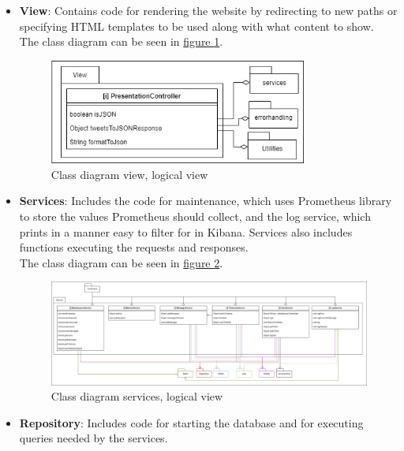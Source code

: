 \begin{itemize}
    \item \textbf{View}: Contains code for rendering the website by redirecting to new paths or specifying HTML templates to be used along with what content to show.\\
    The class diagram can be seen in \hyperref[fig:classDiagramView]{figure \ref{fig:classDiagramView}}.
    \begin{figure}[H]
        \centering
        \includegraphics[width=0.8\textwidth]{images/class_diagram_view.jpg}
        \caption{Class diagram view, logical view}
        \label{fig:classDiagramView}
    \end{figure}
    
    \item \textbf{Services}: Includes the code for maintenance, which uses Prometheus library to store the values Prometheus should collect, and the log service, which prints in a manner easy to filter for in Kibana. Services also includes functions executing the requests and responses.\\
    The class diagram can be seen in \hyperref[fig:classDiagramServices]{figure \ref{fig:classDiagramServices}}.
     \begin{figure}[H]
        \centering
        \hspace*{-1.5in}
        \includegraphics[width=1.6\textwidth]{images/class_diagram_services.jpg}
        \caption{Class diagram services, logical view}
        \label{fig:classDiagramServices}
    \end{figure}
    \item \textbf{Repository}: Includes code for starting the database and for executing queries needed by the services. 
    

\end{itemize}
